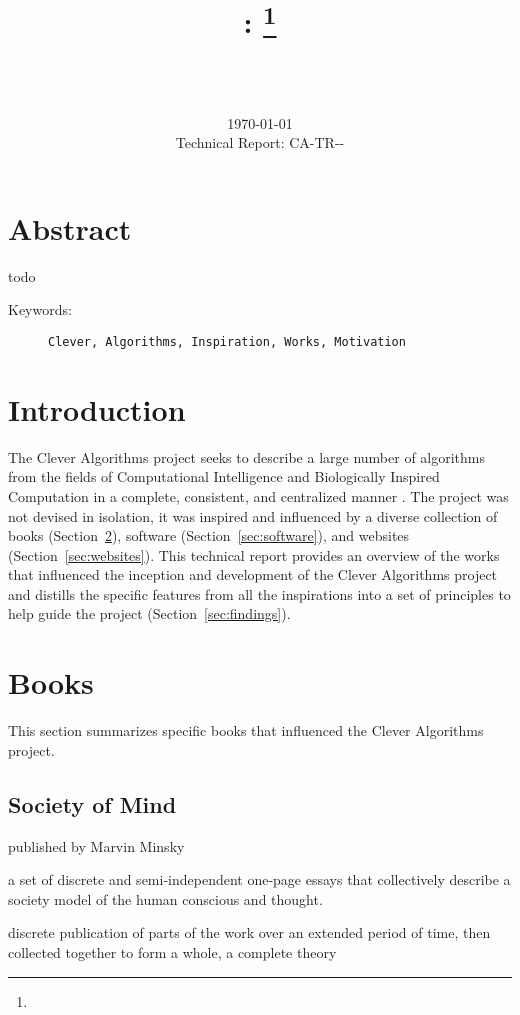 \documentclass[a4paper, 11pt]{article}
\title{{\myreporttitle}: {\myreportsubtitle}\footnote{\myreportlicense}}
\author{\myreportauthor\\{\myreportemail}\\\small\myreportproject}
\date{\today\\{\small{Technical Report: CA-TR-{\myreportdate}-\myreportversion}}}
\begin{document}
\maketitle

\section*{Abstract} 
todo

\begin{description}
	\item[Keywords:] {\small\texttt{Clever, Algorithms, Inspiration, Works, Motivation}}
\end{description} 

\section{Introduction}
\label{sec:introduction}
The Clever Algorithms project seeks to describe a large number of algorithms from the fields of Computational Intelligence and Biologically Inspired Computation in a complete, consistent, and centralized manner \cite{Brownlee2010}. The project was not devised in isolation, it was inspired and influenced by a diverse collection of books (Section~\ref{sec:books}), software (Section~\ref{sec:software}), and websites (Section~\ref{sec:websites}). This technical report provides an overview of the works that influenced the inception and development of the Clever Algorithms project and distills the specific features from all the inspirations into a set of principles to help guide the project (Section~\ref{sec:findings}).

\section{Books}
\label{sec:books}
This section summarizes specific books that influenced the Clever Algorithms project.

\subsection{Society of Mind}
published by Marvin Minsky \cite{Minsky1988}

a set of discrete and semi-independent one-page essays that collectively describe a society model of the human conscious and thought.

discrete publication of parts of the work over an extended period of time, then collected together to form a whole, a complete theory
\end{document}
